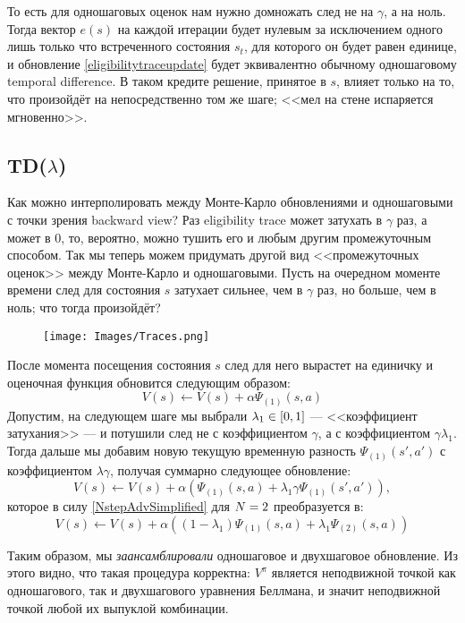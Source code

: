 То есть для одношаговых оценок нам нужно домножать след не на $\gamma$, а на ноль. Тогда вектор $e(s)$ на каждой итерации будет нулевым за исключением одного лишь только что встреченного состояния $s_t$, для которого он будет равен единице, и обновление \ref{eligibilitytraceupdate} будет эквивалентно обычному одношаговому temporal difference. В таком кредите решение, принятое в $s$, влияет только на то, что произойдёт на непосредственно том же шаге; <<мел на стене испаряется мгновенно>>.

\subsection{TD($\lambda$)}

Как можно интерполировать между Монте-Карло обновлениями и одношаговыми с точки зрения backward view? Раз eligibility trace может затухать в $\gamma$ раз, а может в 0, то, вероятно, можно тушить его и любым другим промежуточным способом. Так мы теперь можем придумать другой вид <<промежуточных оценок>> между Монте-Карло и одношаговыми. Пусть на очередном моменте времени след для состояния $s$ затухает сильнее, чем в $\gamma$ раз, но больше, чем в ноль; что тогда произойдёт?

\begin{wrapfigure}{r}{0.3\textwidth}
\centering
\texttt{[image: Images/Traces.png]}
\vspace{0.2cm}
\end{wrapfigure}

После момента посещения состояния $s$ след для него вырастет на единичку и оценочная функция обновится следующим образом:
$$V(s) \leftarrow V(s) + \alpha \Psi_{(1)}(s, a)$$
Допустим, на следующем шаге мы выбрали $\lambda_1 \HM \in [0, 1]$ --- <<коэффициент затухания>> --- и потушили след не с коэффициентом $\gamma$, а с коэффициентом $\gamma \lambda_1$. Тогда дальше мы добавим новую текущую временную разность $\Psi_{(1)}(s', a')$ с коэффициентом $\lambda \gamma$, получая суммарно следующее обновление:
$$V(s) \leftarrow V(s) + \alpha \left( \Psi_{(1)}(s, a) + \lambda_1 \gamma \Psi_{(1)}(s', a') \right),$$
которое в силу \eqref{NstepAdvSimplified} для $N \HM= 2$ преобразуется в:
$$V(s) \leftarrow V(s) + \alpha \left( (1 - \lambda_1) \Psi_{(1)}(s, a) + \lambda_1 \Psi_{(2)}(s, a) \right)$$

Таким образом, мы \emph{заансамблировали} одношаговое и двухшаговое обновление. Из этого видно, что такая процедура корректна: $V^\pi$ является неподвижной точкой как одношагового, так и двухшагового уравнения Беллмана, и значит неподвижной точкой любой их выпуклой комбинации.

